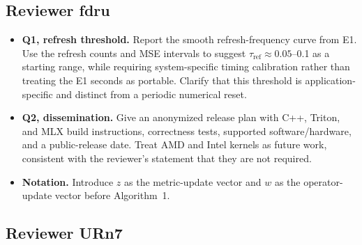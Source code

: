 \documentclass[11pt]{article}
\newcommand{\tref}{\tau_{\mathrm{ref}}}
\begin{document}
\subsection{Reviewer fdru}

\begin{itemize}
  \item \textbf{Q1, refresh threshold.} Report the smooth refresh-frequency
  curve from E1.  Use the refresh counts and MSE intervals to suggest
  \(\tref\approx0.05\)--0.1 as a starting range, while requiring
  system-specific timing calibration rather than treating the E1 seconds as
  portable.  Clarify that this threshold is application-specific and distinct
  from a periodic numerical reset.
  \item \textbf{Q2, dissemination.} Give an anonymized release plan with C++,
  Triton, and MLX build instructions, correctness tests, supported
  software/hardware, and a public-release date.  Treat AMD and Intel kernels as
  future work, consistent with the reviewer's statement that they are not
  required.
  \item \textbf{Notation.} Introduce \(z\) as the metric-update vector and
  \(w\) as the operator-update vector before Algorithm~1.
\end{itemize}

\subsection{Reviewer URn7}
\end{document}
